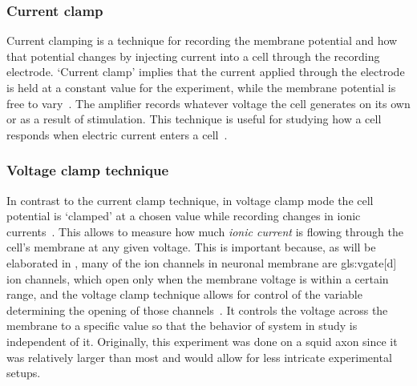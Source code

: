 \documentclass[class={myRUCProject}, crop=false]{standalone}
\begin{document}
\subsubsection{Current clamp}\label{sec:Cclamp}

Current clamping is a technique for recording the membrane potential and how that potential changes by injecting current into a cell through the recording electrode.  
`Current clamp' implies that the current applied through the electrode is held at a constant value for the experiment, while the membrane potential is free to vary~\cite{Hammond2015ch4}. The amplifier records whatever voltage the cell generates on its own or as a result of stimulation. 
This technique is useful for studying how a cell responds when electric current enters a cell~\cite{Hammond2015ch4}.

\subsubsection{Voltage clamp technique}\label{sec:Vclamp}
 
In contrast to the current clamp technique, in voltage clamp mode the cell potential is `clamped' at a chosen value while recording changes in ionic currents~\cite{Hammond2015ch4}. 
This allows to measure how much \textit{ionic current} is flowing through the cell's membrane at any given voltage. 
This is important because, as will be elaborated in , many of the ion channels in neuronal membrane are \gls{gls:vgate}[d] ion channels, which open only when the membrane voltage is within a certain range, and the voltage clamp technique allows for control of the variable determining the opening of those channels~\cite{Hammond2015ch4}. It controls the voltage across the membrane to a specific value so that the behavior of system in study is independent of it. Originally, this experiment was done on a squid axon since it was relatively larger than most and would allow for less intricate experimental setups.
\end{document}

